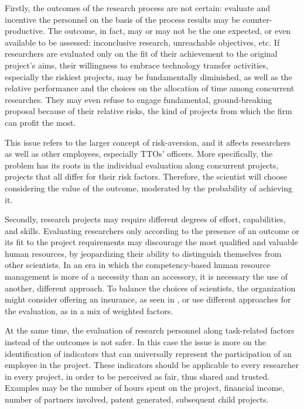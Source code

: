Firstly, the outcomes of the research process are not certain: evaluate and incentive the personnel on the basis of the process results may be counter-productive. The outcome, in fact, may or may not be the one expected, or even available to be assessed: inconclusive research, unreachable objectives, etc. If researchers are evaluated only on the fit of their achievement to the original project's aims, their willingness to embrace technology transfer activities, especially the riskiest projects, may be fundamentally diminished, as well as the relative performance and the choices on the allocation of time among concurrent researches. They may even refuse to engage fundamental, ground-breaking proposal because of their relative risks, the kind of projects from which the firm can profit the most. 

This issue refers to the larger concept of risk-aversion, and it affects researchers as well as other employees, especially TTOs' officers. More specifically, the problem has its roots in the individual evaluation along concurrent projects, projects that all differ for their risk factors. Therefore, the scientist will choose considering the value of the outcome, moderated by the probability of achieving it. 

Secondly, research projects may require different degrees of effort, capabilities, and skills. Evaluating researchers only according to the presence of an outcome or its fit to the project requirements may discourage the most qualified and valuable human resources, by jeopardizing their ability to distinguish themselves from other scientists. In an era in which the competency-based human resource management is more of a necessity than an accessory, it is necessary the use of another, different approach. To balance the choices of scientists, the organization might consider offering an insurance, as seen in \citet{Panagopoulos2013}, or use different approaches for the evaluation, as in a mix of weighted factors.

At the same time, the evaluation of research personnel along task-related factors instead of the outcomes is not safer. In this case the issue is more on the identification of indicators that can universally represent the participation of an employee in the project. These indicators should be applicable to every researcher in every project, in order to be perceived as fair, thus shared and trusted. Examples may be the number of hours spent on the project, financial income, number of partners involved, patent generated, subsequent child projects. 

